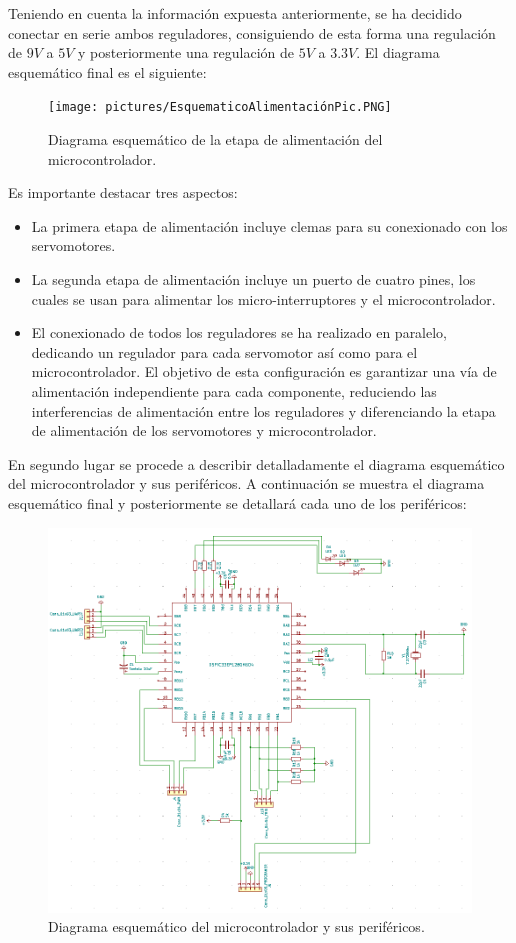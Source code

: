 Teniendo en cuenta la información expuesta anteriormente, se ha decidido conectar en serie ambos reguladores, consiguiendo de esta forma una regulación de $9V$ a $5V$ y posteriormente una regulación de $5V$ a $3.3V$. El diagrama esquemático final es el siguiente:

    \begin{figure}[H]
    \centering 
    \texttt{[image: pictures/EsquematicoAlimentaciónPic.PNG]}
    \caption{Diagrama esquemático de la etapa de alimentación del microcontrolador.}
    \label{fig:CAMBIAR!!!!!!!!!!}
    \end{figure}

Es importante destacar tres aspectos:
\begin{itemize}
    \item La primera etapa de alimentación incluye clemas para su conexionado con los servomotores.
    \item La segunda etapa de alimentación incluye un puerto de cuatro pines, los cuales se usan para alimentar los micro-interruptores y el microcontrolador.
    \item El conexionado de todos los reguladores se ha realizado en paralelo, dedicando un regulador para cada servomotor así como para el microcontrolador. El objetivo de esta configuración es garantizar una vía de alimentación independiente para cada componente, reduciendo las interferencias de alimentación entre los reguladores y diferenciando la etapa de alimentación de los servomotores y microcontrolador.
\end{itemize}

En segundo lugar se procede a describir detalladamente el diagrama esquemático del microcontrolador y sus periféricos. A continuación se muestra el diagrama esquemático final y posteriormente se detallará cada uno de los periféricos:

\begin{figure}[H]
    \centering 
    \includegraphics[width=.95\linewidth]{pictures/EsquematicoMicrocontrolador.PNG}
    \caption{Diagrama esquemático del microcontrolador y sus periféricos.}
    \label{fig:CAMBIAR!!!!!!!!!!}
\end{figure}

